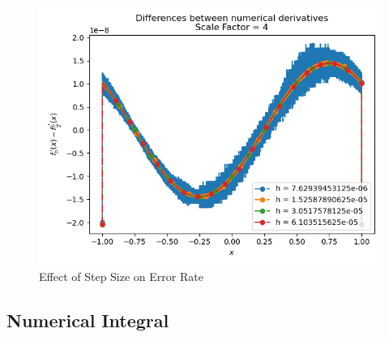\documentclass[letterpaper,12pt]{article}
\begin{document}
\begin{figure}[H]
\centerline{\includegraphics[width=\linewidth]{figures/14-2.png}}
\caption{Effect of Step Size on Error Rate}
\label{fig:14-2}
\end{figure}


\subsection{Numerical Integral}
\end{document}
